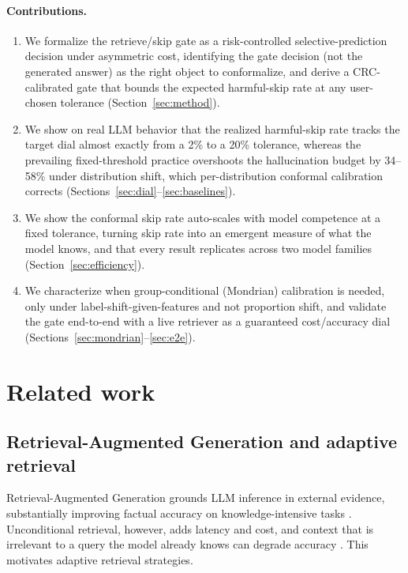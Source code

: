 \documentclass[a4paper,fleqn]{cas-dc}
\begin{document}
\paragraph{Contributions.}
\begin{enumerate}[(1)]
\item We formalize the retrieve/skip gate as a risk-controlled
selective-prediction decision under asymmetric cost, identifying the gate
decision (not the generated answer) as the right object to conformalize, and
derive a CRC-calibrated gate that bounds the expected harmful-skip rate at any
user-chosen tolerance (Section~\ref{sec:method}).
\item We show on real LLM behavior that the realized harmful-skip rate tracks the
target dial almost exactly from a 2\% to a 20\% tolerance, whereas the prevailing
fixed-threshold practice overshoots the hallucination budget by 34--58\% under
distribution shift, which per-distribution conformal calibration corrects
(Sections~\ref{sec:dial}--\ref{sec:baselines}).
\item We show the conformal skip rate auto-scales with model competence at a fixed
tolerance, turning skip rate into an emergent measure of what the model knows, and
that every result replicates across two model families
(Section~\ref{sec:efficiency}).
\item We characterize when group-conditional (Mondrian) calibration is
needed, only under label-shift-given-features and not proportion shift, and
validate the gate end-to-end with a live retriever as a guaranteed cost/accuracy
dial (Sections~\ref{sec:mondrian}--\ref{sec:e2e}).
\end{enumerate}

\section{Related work}\label{sec:related}

\subsection{Retrieval-Augmented Generation and adaptive retrieval}

Retrieval-Augmented Generation \citep{lewis2020rag} grounds LLM inference in
external evidence, substantially improving factual accuracy on knowledge-intensive
tasks \citep{gao2023ragsurvey,karpukhin2020dpr}. Unconditional retrieval,
however, adds latency and cost, and context that is irrelevant to a query the
model already knows can degrade accuracy \citep{yan2024crag}. This motivates
adaptive retrieval strategies.
\end{document}
